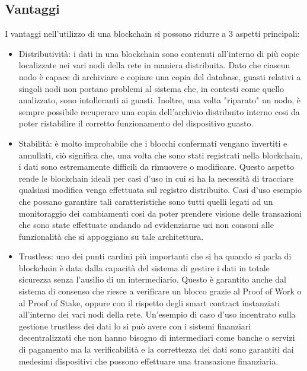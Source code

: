 \subsection{Vantaggi}
I vantaggi nell'utilizzo di una blockchain si possono ridurre a 3 aspetti principali:
\begin{itemize}
    \item Distributività: i dati in una blockchain sono contenuti all'interno di più copie localizzate nei vari nodi della rete in maniera distribuita. Dato che ciascun nodo è capace di archiviare e copiare una copia del database, guasti relativi a singoli nodi non portano problemi al sistema che, in contesti come quello analizzato, sono intolleranti ai guasti. Inoltre, una volta "riparato" un nodo, è sempre possibile recuperare una copia dell'archivio distribuito interno cosi da poter ristabilire il corretto funzionamento del dispositivo guasto. 
    \item Stabilità: è molto improbabile che i blocchi confermati vengano invertiti e annullati, ciò significa che, una volta che sono stati registrati nella blockchain, i dati sono estremamente difficili da rimuovere o modificare. Questo aspetto rende le blockchain ideali per casi d'uso in cui si ha la necessità di tracciare qualsiasi modifica venga effettuata sul registro distribuito. Casi d'uso esempio che possano garantire tali caratteristiche sono tutti quelli legati ad un monitoraggio dei cambiamenti cosi da poter prendere visione delle transazioni che sono state effettuate andando ad evidenziarne usi non consoni alle funzionalità che si appoggiano su tale architettura. 
    \item Trustless: uno dei punti cardini più importanti che si ha quando si parla di blockchain è data dalla capacità del sistema di gestire i dati in totale sicurezza senza l'ausilio di un intermediario. Questo è garantito anche dal sistema di consenso che riesce a verificare un blocco grazie al Proof of Work o al Proof of Stake, oppure con il rispetto degli smart contract instanziati all'interno dei vari nodi della rete. Un'esempio di caso d'uso incentrato sulla gestione trustless dei dati lo si può avere con i sistemi finanziari decentralizzati che non hanno bisogno di intermediari come banche o servizi di pagamento ma la verificabilità e la correttezza dei dati sono garantiti dai medesimi dispositivi che possono effettuare una transazione finanziaria. 
\end{itemize}
